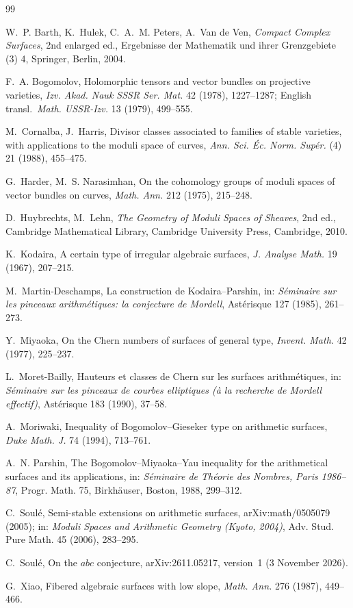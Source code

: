 \documentclass[11pt]{article}
\theoremstyle{definition}
\theoremstyle{remark}
\begin{document}
{}
\begin{thebibliography}{99}
\small
\frenchspacing

W.~P. Barth, K.~Hulek, C.~A.~M. Peters, A.~Van de Ven,
\emph{Compact Complex Surfaces}, 2nd enlarged ed.,
Ergebnisse der Mathematik und ihrer Grenzgebiete (3) 4, Springer, Berlin, 2004.

F.~A. Bogomolov,
Holomorphic tensors and vector bundles on projective varieties,
\emph{Izv. Akad. Nauk SSSR Ser. Mat.} 42 (1978), 1227--1287;
English transl.\ \emph{Math. USSR-Izv.} 13 (1979), 499--555.

M.~Cornalba, J.~Harris,
Divisor classes associated to families of stable varieties, with applications
to the moduli space of curves,
\emph{Ann. Sci. \'Ec. Norm. Sup\'er.} (4) 21 (1988), 455--475.

G.~Harder, M.~S. Narasimhan,
On the cohomology groups of moduli spaces of vector bundles on curves,
\emph{Math. Ann.} 212 (1975), 215--248.

D.~Huybrechts, M.~Lehn,
\emph{The Geometry of Moduli Spaces of Sheaves}, 2nd ed.,
Cambridge Mathematical Library, Cambridge University Press, Cambridge, 2010.

K.~Kodaira,
A certain type of irregular algebraic surfaces,
\emph{J. Analyse Math.} 19 (1967), 207--215.

M.~Martin-Deschamps,
La construction de Kodaira--Parshin,
in: \emph{S\'eminaire sur les pinceaux arithm\'etiques: la conjecture de Mordell},
Ast\'erisque 127 (1985), 261--273.

Y.~Miyaoka,
On the Chern numbers of surfaces of general type,
\emph{Invent. Math.} 42 (1977), 225--237.

L.~Moret-Bailly,
Hauteurs et classes de Chern sur les surfaces arithm\'etiques,
in: \emph{S\'eminaire sur les pinceaux de courbes elliptiques (\`a la recherche
de \guillemotleft Mordell effectif\guillemotright)}, Ast\'erisque 183 (1990), 37--58.

A.~Moriwaki,
Inequality of Bogomolov--Gieseker type on arithmetic surfaces,
\emph{Duke Math. J.} 74 (1994), 713--761.

A.~N. Parshin,
The Bogomolov--Miyaoka--Yau inequality for the arithmetical surfaces and its
applications,
in: \emph{S\'eminaire de Th\'eorie des Nombres, Paris 1986--87},
Progr. Math. 75, Birkh\"auser, Boston, 1988, 299--312.

C.~Soul\'e,
Semi-stable extensions on arithmetic surfaces,
arXiv:math/0505079 (2005); in: \emph{Moduli Spaces and Arithmetic Geometry
(Kyoto, 2004)}, Adv. Stud. Pure Math. 45 (2006), 283--295.

C.~Soul\'e,
On the $abc$ conjecture,
arXiv:2611.05217, version~1 (3 November 2026).

G.~Xiao,
Fibered algebraic surfaces with low slope,
\emph{Math. Ann.} 276 (1987), 449--466.

\end{thebibliography}
\end{document}
